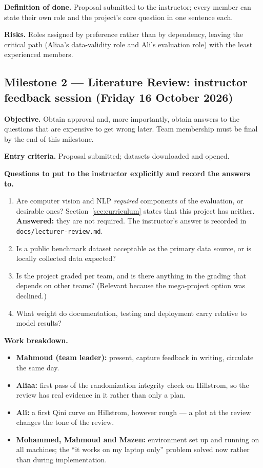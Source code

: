 \documentclass[11pt,a4paper]{article}
\begin{document}
\textbf{Definition of done.} Proposal submitted to the instructor; every member can state their own
role and the project's core question in one sentence each.

\textbf{Risks.} Roles assigned by preference rather than by dependency, leaving the critical path
(Aliaa's data-validity role and Ali's evaluation role) with the least experienced members.

\subsection{Milestone 2 --- Literature Review: instructor feedback session (Friday 16 October 2026)}

\textbf{Objective.} Obtain approval and, more importantly, obtain answers to the questions that are
expensive to get wrong later. Team membership must be final by the end of this milestone.

\textbf{Entry criteria.} Proposal submitted; datasets downloaded and opened.

\textbf{Questions to put to the instructor explicitly and record the answers to.}
\begin{enumerate}
\item Are computer vision and NLP \emph{required} components of the evaluation, or desirable ones?
Section~\ref{sec:curriculum} states that this project has neither. \textbf{Answered:} they are not
required. The instructor's answer is recorded in \texttt{docs/lecturer-review.md}.
\item Is a public benchmark dataset acceptable as the primary data source, or is locally collected
data expected?
\item Is the project graded per team, and is there anything in the grading that depends on other
teams? (Relevant because the mega-project option was declined.)
\item What weight do documentation, testing and deployment carry relative to model results?
\end{enumerate}

\textbf{Work breakdown.}
\begin{itemize}
\item \textbf{Mahmoud (team leader):} present, capture feedback in writing, circulate the same day.
\item \textbf{Aliaa:} first pass of the randomization integrity check on Hillstrom, so the review
has real evidence in it rather than only a plan.
\item \textbf{Ali:} a first Qini curve on Hillstrom, however rough --- a plot at the review changes
the tone of the review.
\item \textbf{Mohammed, Mahmoud and Mazen:} environment set up and running on all machines; the ``it works on my
laptop only'' problem solved now rather than during implementation.
\end{itemize}
\end{document}
